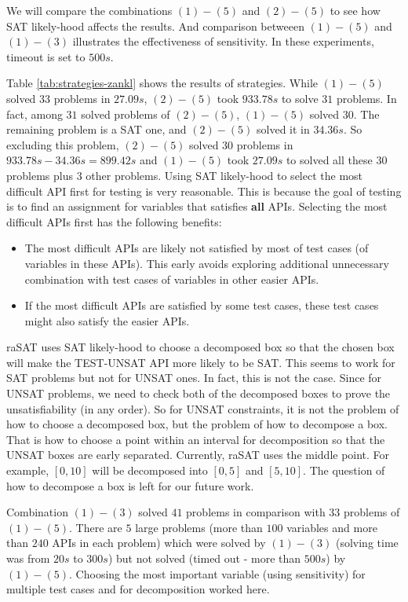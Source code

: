 We will compare the combinations $(1)-(5)$ and $(2)-(5)$ to see how SAT likely-hood affects the results. And comparison betweeen $(1)-(5)$ and $(1)-(3)$ illustrates the effectiveness of sensitivity. In these experiments, timeout is set to $500s$.

 Table \ref{tab:strategies-zankl} shows the results of strategies. While $(1)-(5)$ solved $33$ problems in $27.09s$, $(2)-(5)$ took $933.78s$ to solve $31$ problems. In fact, among $31$ solved problems of $(2)-(5)$, $(1)-(5)$ solved $30$. The remaining problem is a SAT one, and $(2)-(5)$ solved it in $34.36s$. So excluding this problem, $(2)-(5)$ solved $30$ problems in $933.78s - 34.36s = 899.42s$ and $(1)-(5)$ took $27.09s$ to solved all these $30$ problems plus $3$ other problems. Using SAT likely-hood to select the most difficult API first for testing is very reasonable. This is because the goal of testing is to find an assignment for variables that satisfies \textbf{all} APIs. Selecting the most difficult APIs first has the following benefits: 
\begin{itemize}
  \item The most difficult APIs are likely not satisfied by most of test cases (of variables in these APIs). This early avoids exploring additional unnecessary combination with test cases of variables in other easier APIs.
  \item If the most difficult APIs are satisfied by some test cases, these test cases might also satisfy the easier APIs.
\end{itemize}

raSAT uses SAT likely-hood to choose a decomposed box so that the chosen box will make the TEST-UNSAT API more likely to be SAT. This seems to work for SAT problems but not for UNSAT ones. In fact, this is not the case. Since for UNSAT problems, we need to check both of the decomposed boxes to prove the unsatisfiability (in any order). So for UNSAT constraints, it is not the problem of how to choose a decomposed box, but the problem of how to decompose a box. That is how to choose a point within an interval for decomposition so that the UNSAT boxes are early separated. Currently, raSAT uses the middle point. For example, $[0, 10]$ will be decomposed into $[0, 5]$ and $[5, 10]$. The question of how to decompose a box is left for our future work.

Combination $(1)-(3)$ solved $41$ problems in comparison with $33$ problems of $(1)-(5)$. There are $5$ large problems (more than $100$ variables and more than $240$ APIs in each problem) which were solved by $(1)-(3)$ (solving time was from $20s$ to $300s$) but not solved (timed out - more than $500s$) by $(1)-(5)$. Choosing the most important variable (using sensitivity) for multiple test cases and for decomposition worked here.

